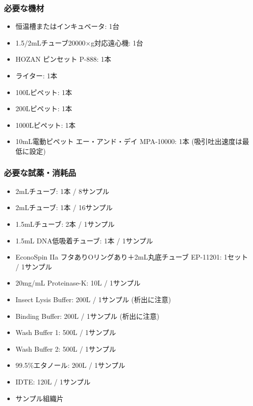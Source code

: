 \documentclass[titlepage,10pt,a4paper,uplatex]{jsbook}
\begin{document}
\subsubsection{必要な機材}
\begin{itemize}
\item 恒温槽またはインキュベータ: 1台
\item 1.5/2mLチューブ20000×g対応遠心機: 1台
\item HOZAN ピンセット P-888: 1本
\item ライター: 1本
\item 100{\textmu}Lピペット: 1本
\item 200{\textmu}Lピペット: 1本
\item 1000{\textmu}Lピペット: 1本
\item 10mL電動ピペット エー・アンド・デイ MPA-10000: 1本 (吸引吐出速度は最低に設定)
\end{itemize}

\subsubsection{必要な試薬・消耗品}
\begin{itemize}
\item 2mLチューブ: 1本 / 8サンプル
\item 2mLチューブ: 1本 / 16サンプル
\item 1.5mLチューブ: 2本 / 1サンプル
\item 1.5mL DNA低吸着チューブ: 1本 / 1サンプル
\item EconoSpin IIa フタありOリングあり＋2mL丸底チューブ EP-11201: 1セット / 1サンプル
\item 20mg/mL Proteinase-K: 10{\textmu}L / 1サンプル
\item Insect Lysis Buffer: 200{\textmu}L / 1サンプル (析出に注意)
\item Binding Buffer: 200{\textmu}L / 1サンプル (析出に注意)
\item Wash Buffer 1: 500{\textmu}L / 1サンプル
\item Wash Buffer 2: 500{\textmu}L / 1サンプル
\item 99.5\%エタノール: 200{\textmu}L / 1サンプル
\item IDTE: 120{\textmu}L / 1サンプル
\item サンプル組織片
\end{itemize}
\end{document}
